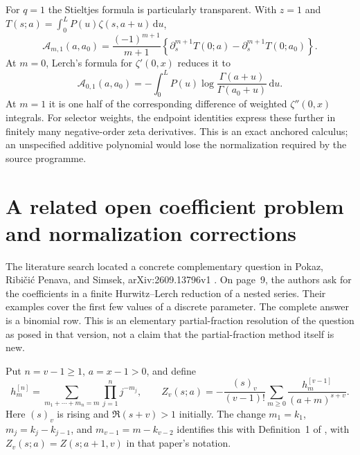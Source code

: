 \documentclass[11pt,letterpaper]{article}
\numberwithin{equation}{section}
\theoremstyle{definition}
\theoremstyle{remark}\newtheorem{remark}[theorem]{Remark}
\newcommand{\dd}{\,\mathrm d}
\begin{document}
For $q=1$ the Stieltjes formula is particularly transparent. With
$z=1$ and $T(s;a)=\int_0^LP(u)\zeta(s,a+u)\dd u$,
\begin{equation}\label{pls:eq:primitivefirst}
 \mathcal A_{m,1}(a,a_0)=\frac{(-1)^{m+1}}{m+1}
       \left\{\partial_s^{m+1}T(0;a)
                    -\partial_s^{m+1}T(0;a_0)\right\}.
\end{equation}
At $m=0$, Lerch's formula for $\zeta'(0,x)$ reduces it to
\begin{equation}\label{pls:eq:primitiveGamma}
 \mathcal A_{0,1}(a,a_0)
 =-\int_0^L P(u)
              \log\frac{\Gamma(a+u)}{\Gamma(a_0+u)}\dd u.
\end{equation}
At $m=1$ it is one half of the corresponding difference of weighted
$\zeta''(0,x)$ integrals. For selector weights, the endpoint identities
express these further in finitely many negative-order zeta derivatives.
This is an exact anchored calculus; an unspecified additive polynomial
would lose the normalization required by the source programme.

\section{A related open coefficient problem and normalization corrections}
\label{pls:sec:coefficientproblem}

The literature search located a concrete complementary question in
Pokaz, Ribi\v ci\'c Penava, and Simsek, arXiv:2609.13796v1
\cite{PPS}. On page~9, the authors ask for the coefficients in a
finite Hurwitz--Lerch reduction of a nested series. Their examples
cover the first few values of a discrete parameter. The complete
answer is a binomial row. This is an elementary partial-fraction
resolution of the question as posed in that version, not a claim that
the partial-fraction method itself is new.

Put $n=v-1\ge1$, $a=x-1>0$, and define
\begin{equation}\label{pls:eq:hmnodes}
 h_m^{[n]}=\sum_{m_1+\cdots+m_n=m}\prod_{j=1}^n j^{-m_j},
 \qquad
 Z_v(s;a)=-\frac{(s)_v}{(v-1)!}
              \sum_{m\ge0}\frac{h_m^{[v-1]}}{(a+m)^{s+v}}.
\end{equation}
Here $(s)_v$ is rising and $\Re(s+v)>1$ initially. The change
$m_1=k_1$, $m_j=k_j-k_{j-1}$, and
$m_{v-1}=m-k_{v-2}$ identifies this with Definition~1 of
\cite{PPS}, with $Z_v(s;a)=Z(s;a+1,v)$ in that paper's notation.
\end{document}
